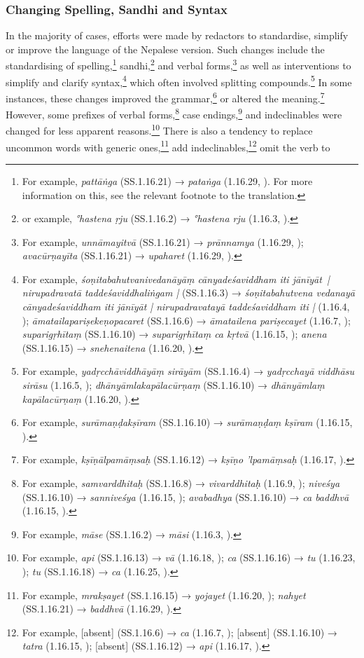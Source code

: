 \subsubsection{Changing Spelling, Sandhi and Syntax}
In the majority of cases, efforts were made by redactors to standardise, simplify or improve the language of the Nepalese version. Such changes include the standardising of spelling,\footnote{For example, \emph{pattāṅga} (SS.1.16.21) → \emph{pataṅga} (1.16.29, \cite[81]{vulgate}). For more information on this, see the relevant footnote to the translation.} sandhi,\footnote{or example, \emph{°hastena ṛju} (SS.1.16.2) → \emph{°hastena rju} (1.16.3, \cite[76]{vulgate}).} and verbal forms,\footnote{For example, \emph{unnāmayitvā} (SS.1.16.21) → \emph{prānnamya} (1.16.29, \cite[81]{vulgate}); \emph{avacūrṇayīta} (SS.1.16.21) → \emph{upaharet} (1.16.29, \cite[81]{vulgate}).} as well as interventions to simplify and clarify syntax,\footnote{For example, \emph{śoṇitabahutvanivedanāyāṃ cānyadeśaviddham iti jānīyāt | nirupadravatā taddeśaviddhaliṅgam |} (SS.1.16.3) → \emph{śoṇitabahutvena vedanayā cānyadeśaviddham iti jānīyāt | nirupadravatayā taddeśaviddham iti |} (1.16.4, \cite[76]{vulgate}); \emph{āmatailapariṣekeṇopacaret} (SS.1.16.6) → \emph{āmatailena pariṣecayet} (1.16.7, \cite[77]{vulgate}); \emph{suparigṛhītaṃ} (SS.1.16.10) → \emph{suparigṛhītaṃ ca kṛtvā} (1.16.15, \cite[78]{vulgate}); \emph{anena} (SS.1.16.15) → \emph{snehenaitena} (1.16.20, \cite[79]{vulgate}).} which often involved splitting compounds.\footnote{For example, \emph{yadṛcchāviddhāyāṃ sirāyām} (SS.1.16.4) → \emph{yadṛcchayā viddhāsu sirāsu} (1.16.5, \cite[76]{vulgate}); \emph{dhānyāmlakapālacūrṇaṃ} (SS.1.16.10) → \emph{dhānyāmlaṃ kapālacūrṇaṃ} (1.16.20, \cite[78]{vulgate}).} In some instances, these changes improved the grammar,\footnote{For example, \emph{surāmaṇḍakṣīram} (SS.1.16.10) → \emph{surāmaṇḍaṃ kṣīram} (1.16.15, \cite[78]{vulgate}).} or altered the meaning.\footnote{For example, \emph{kṣīṇālpamāṃsaḥ} (SS.1.16.12) → \emph{kṣīṇo 'lpamāṃsaḥ} (1.16.17, \cite[79]{vulgate}).} However, some prefixes of verbal forms,\footnote{For example, \emph{samvarddhitaḥ} (SS.1.16.8) → \emph{vivarddhitaḥ} (1.16.9, \cite[77]{vulgate}); \emph{niveśya} (SS.1.16.10) → \emph{sanniveśya} (1.16.15, \cite[78]{vulgate}); \emph{avabadhya} (SS.1.16.10) → \emph{ca baddhvā} (1.16.15, \cite[78]{vulgate}).} case endings,\footnote{For example, \emph{māse} (SS.1.16.2) → \emph{māsi} (1.16.3, \cite[76]{vulgate}).} and indeclinables were changed for less apparent reasons.\footnote{For example, \emph{api} (SS.1.16.13) → \emph{vā} (1.16.18, \cite[79]{vulgate}); \emph{ca} (SS.1.16.16) → \emph{tu} (1.16.23, \cite[79]{vulgate}); \emph{tu} (SS.1.16.18) → \emph{ca} (1.16.25, \cite[80]{vulgate}).} There is also a tendency to replace uncommon words with generic ones,\footnote{For example, \emph{mrakṣayet} (SS.1.16.15) → \emph{yojayet} (1.16.20, \cite[79]{vulgate}); \emph{nahyet} (SS.1.16.21) → \emph{baddhvā} (1.16.29, \cite[81]{vulgate}).} add indeclinables,\footnote{For example, [absent]  (SS.1.16.6) → \emph{ca} (1.16.7, \cite[77]{vulgate}); [absent] (SS.1.16.10) → \emph{tatra} (1.16.15, \cite[78]{vulgate}); [absent]  (SS.1.16.12) → \emph{api} (1.16.17, \cite[79]{vulgate}).} omit the verb to 